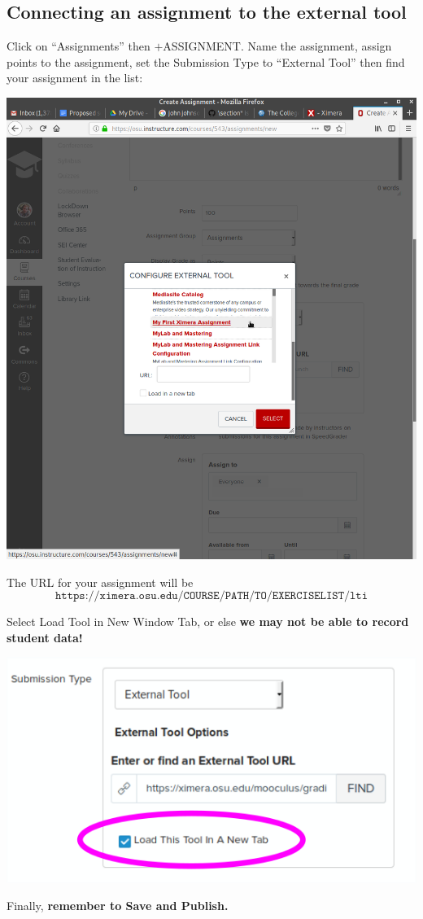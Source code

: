 \documentclass{ximera}
\begin{document}
\subsection{Connecting an  assignment to the external tool}

Click on ``Assignments'' then $+$ASSIGNMENT. Name the assignment, assign points to the assignment, 
set the Submission Type to ``External Tool'' then find your assignment in the list:
\begin{image}
  \includegraphics{canvas5.png}
\end{image}
The URL  for your assignment will be
\[
\texttt{https://ximera.osu.edu/COURSE/PATH/TO/EXERCISELIST/lti}
\]
\begin{warning}
Select Load Tool in New Window Tab, or else \textbf{we may not be able to record student data!}
\begin{image}
  \includegraphics{canvas6.png}
\end{image}
\end{warning}
Finally, \textbf{remember to Save and Publish.}
\end{document}
